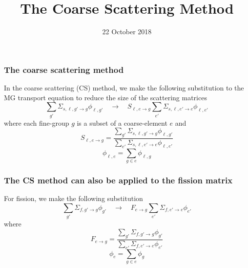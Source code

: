 \documentclass[xcolor=dvipsnames]{beamer}
\title{The Coarse Scattering Method}
\date{{22 October 2018}}
\begin{document}
\begin{frame}
    \titlepage 
    \begin{center}
    \end{center}    
\end{frame}


\begin{frame}
\frametitle{The coarse scattering method}

\pause

In the coarse scattering (CS) method, we make the following substitution to the MG transport equation to reduce the size of the scattering matrices
\begin{equation*}
\label{eq:scatter}
\sum_{g'} \Sigma_{s,\ell,g'\to g} \phi_{\ell,g'} \quad \to \quad S_{\ell,e\to g} \sum_{e'} \Sigma_{s,\ell,e'\to e} \phi_{\ell,e'} 
\end{equation*}
where each fine-group $g$ is a subset of a coarse-element $e$ and
\begin{equation*}
\label{Eq.S}
S_{\ell,e\to g}  = \frac{\sum_{g'} \Sigma_{s,\ell,g'\to g} \phi_{\ell,g'}}{ \sum_{e'} \Sigma_{s,\ell,e'\to e} \phi_{\ell,e'}} 
\end{equation*}
\begin{equation*}
\phi_{\ell,e} = \sum_{g \in e} \phi_{\ell,g} 
\end{equation*}

\end{frame}

\begin{frame}
\frametitle{The CS method can also be applied to the fission matrix}


For fission, we make the following substitution
\begin{equation*}
\label{eq:fission}
\sum_{g'} \Sigma_{f,g'\to g} \phi_{g'} \quad \to \quad  F_{e\to g} \sum_{e'} \Sigma_{f,e'\to e} \phi_{e'} 
\end{equation*}
where 
\begin{equation*}
\label{Eq.S}
F_{e\to g}  = \frac{\sum_{g'} \Sigma_{f,g'\to g} \phi_{g'}}{ \sum_{e'} \Sigma_{f,e'\to e} \phi_{e'}} 
\end{equation*}
\begin{equation*}
\phi_{e} = \sum_{g \in e} \phi_{g} 
\end{equation*}

\end{frame}
\end{document}
